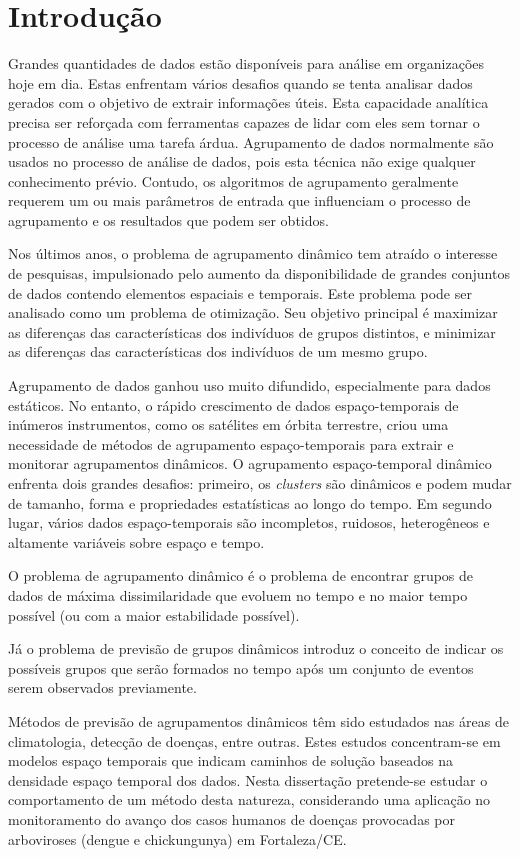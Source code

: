 \chapter{Introdução}
\label{chap:introducao}
Grandes quantidades de dados estão disponíveis para análise em organizações hoje em dia.
Estas enfrentam vários desafios quando se tenta analisar dados gerados com o objetivo de
extrair informações úteis.
Esta capacidade analítica precisa ser reforçada com ferramentas capazes de lidar com eles sem tornar o processo de análise uma tarefa árdua.
Agrupamento de dados normalmente são usados no processo de análise de dados, pois esta técnica
não exige qualquer conhecimento prévio. Contudo, os algoritmos de agrupamento
geralmente requerem um ou mais parâmetros de entrada que influenciam o processo de
agrupamento e os resultados que podem ser obtidos. 

Nos últimos anos, o problema de agrupamento dinâmico tem atraído o interesse de pesquisas,
impulsionado pelo aumento da disponibilidade de grandes conjuntos de dados contendo
elementos espaciais e temporais. Este problema pode ser analisado como um problema de
otimização. Seu objetivo principal é maximizar as diferenças das características dos
indivíduos de grupos distintos, e minimizar as diferenças das características dos
indivíduos de um mesmo grupo.


Agrupamento de dados ganhou uso muito difundido, especialmente para dados estáticos.
No entanto, o rápido crescimento de dados espaço-temporais de inúmeros instrumentos,
como os satélites em órbita terrestre, criou uma necessidade de métodos de agrupamento
espaço-temporais para extrair e monitorar agrupamentos dinâmicos. O agrupamento espaço-temporal
dinâmico enfrenta dois grandes desafios: primeiro, os \textit{clusters} são dinâmicos e podem mudar de
tamanho, forma e propriedades estatísticas ao longo do tempo. Em segundo lugar, vários dados
espaço-temporais são incompletos, ruidosos, heterogêneos e altamente variáveis sobre espaço e tempo.


O problema de agrupamento dinâmico é o problema de encontrar grupos de dados de máxima dissimilaridade que evoluem no tempo e no maior tempo possível (ou com a maior estabilidade possível).

Já o problema de previsão de grupos dinâmicos introduz o conceito de indicar os
possíveis grupos que serão formados no tempo após um conjunto de eventos serem
observados previamente.

Métodos de previsão de agrupamentos dinâmicos têm sido estudados nas áreas de climatologia, detecção de doenças, entre outras. Estes estudos concentram-se em modelos espaço temporais que indicam caminhos de solução baseados na densidade espaço temporal dos dados. Nesta dissertação pretende-se estudar o comportamento de um método desta natureza, considerando uma aplicação no monitoramento do avanço dos casos humanos de doenças provocadas por arboviroses (dengue e chickungunya) em Fortaleza/CE.

